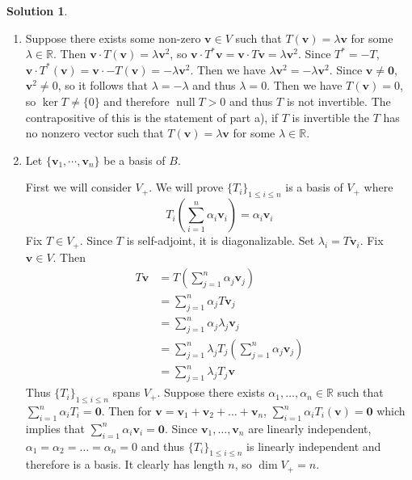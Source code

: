 \documentclass[11pt]{article}
\theoremstyle{definition}
\newtheorem*{solution}{Solution}
\newcommand{\R}{\mathbb{R}}
\DeclareMathOperator{\nul}{null}
\newcommand{\vv}{\mathbf{v}}
\newcommand{\vzero}{\mathbf{0}}
\begin{document}
    \begin{solution}
        \begin{enumerate}[label = \alph*)]
            \item Suppose there exists some non-zero $\vv \in V$ such that $T(\vv) = \lambda \vv$ for some $\lambda \in \R$. Then $\vv \cdot T(\vv) = \lambda \vv^2$, so $\vv \cdot T^* \vv = \vv \cdot T \vv = \lambda \vv^2$. Since $T^* = -T$, $\vv \cdot T^*(\vv) = \vv \cdot -T(\vv) = -\lambda \vv^2$. Then we have $\lambda \vv^2 = -\lambda \vv^2$. Since $\vv \neq \vzero$, $\vv^2 \neq 0$, so it follows that $\lambda = -\lambda$ and thus $\lambda = 0$. Then we have $T(\vv) = 0$, so $\ker T \neq \{0\}$ and therefore $\nul T > 0$ and thus $T$ is not invertible. The contrapositive of this is the statement of part a), if $T$ is invertible the $T$ has no nonzero vector such that $T(\vv) = \lambda \vv$ for some $\lambda \in \R$.
            \item Let $\{\vv_1, \cdots, \vv_n\}$ be a basis of $B$. 
            
            First we will consider $V_+$. We will prove $\{T_i\}_{1\le i\le n}$ is a basis of $V_+$ where $$T_i\left(\sum_{i=1}^n \alpha_i \vv_i\right) = \alpha_i \vv_i$$Fix $T \in V_+$. Since $T$ is self-adjoint, it is diagonalizable. Set $\lambda_i = T\vv_i$. Fix $\vv \in V$. Then 
            \begin{align*}
                T\vv &= T\left(\sum_{j=1}^n \alpha_j \vv_j \right) \\
                &= \sum_{j=1}^n \alpha_j T\vv_j \\
                &= \sum_{j=1}^n \alpha_j \lambda_j \vv_j\\ 
                &= \sum_{j=1}^n \lambda_j T_j\left(\sum_{j=1}^n \alpha_j \vv_j\right)\\ 
                &= \sum_{j=1}^n \lambda_j T_j\vv
            \end{align*}
            Thus $\{T_i\}_{1\le i\le n}$ spans $V_+$. Suppose there exists $\alpha_1, \dots, \alpha_n \in \R$ such that $\sum_{i = 1}^n \alpha_i T_i = \vzero$. Then for $\vv = \vv_1 + \vv_2 + \dots + \vv_n$, $\sum_{i=1}^n \alpha_i T_i(\vv) = \vzero$ which implies that $\sum_{i=1}^n \alpha_i \vv_i = \vzero$. Since $\vv_1, \dots, \vv_n$ are linearly independent, $\alpha_1 = \alpha_2 = \dots = \alpha_n = 0$ and thus $\{T_i\}_{1\le i\le n}$ is linearly independent and therefore is a basis. It clearly has length $n$, so $\dim V_+ = n$.


\end{enumerate}
\end{solution}
\end{document}
